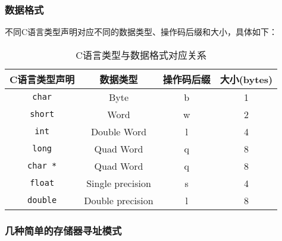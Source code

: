 \subsubsection{数据格式}
不同C语言类型声明对应不同的数据类型、操作码后缀和大小，具体如下：
\begin{table}[H]
    \captionsetup{skip=4pt}
    \centering
    \setlength{\arrayrulewidth}{1pt}
    \begin{tabular}{cccc}
        \hline
        C语言类型声明                & 数据类型             & 操作码后缀 & 大小(bytes) \\
        \hline
        \texttt{char}   & Byte             & b     & 1         \\
        \texttt{short}  & Word             & w     & 2         \\
        \texttt{int}    & Double Word      & l     & 4         \\
        \texttt{long}   & Quad Word        & q     & 8         \\
        \texttt{char *} & Quad Word        & q     & 8         \\
        \texttt{float}  & Single precision & s     & 4         \\
        \texttt{double} & Double precision & l     & 8         \\
        \hline
    \end{tabular}
    \caption{C语言类型与数据格式对应关系}
\end{table}
\subsubsection{几种简单的存储器寻址模式}

